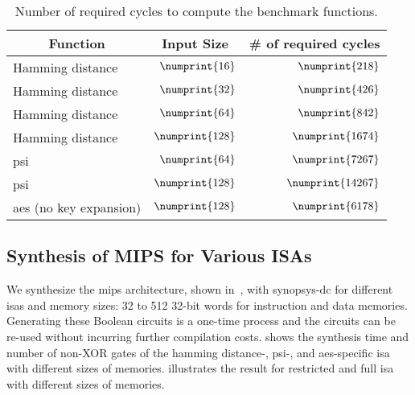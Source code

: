 \begin{table}
\centering
\caption{Number of required cycles to compute the benchmark functions.}\label{tab:cyc_bench}
\begin{tabular}{l||r|r}
\multicolumn{1}{c||}{Function} & \multicolumn{1}{c|}{Input Size} &  \multicolumn{1}{c}{\# of required cycles} \\
\hline
\hline
Hamming distance & $\numprint{16}$ & $\numprint{218}$\\
\hline
 Hamming distance & $\numprint{32}$ & $\numprint{426}$\\
\hline
Hamming distance & $\numprint{64}$ & $\numprint{842}$\\
\hline
Hamming distance & $\numprint{128}$ & $\numprint{1674}$\\
\hline
\acrshort{psi} & $\numprint{64}$ &$\numprint{7267}$\\
\hline
\acrshort{psi} & $\numprint{128}$ &$\numprint{14267}$\\
\hline
\acrshort{aes} (no key expansion) & $\numprint{128}$ & $\numprint{6178}$\\
\end{tabular}
\end{table}

\subsection{Synthesis of MIPS for Various ISAs}\label{ssect:eval-mips-sfe-isa}
We synthesize the \gls{mips} architecture, shown in~, with \gls{synopsys-dc} for different \acrshort{isa}s and memory sizes: 32 to 512 32-bit words for instruction and data memories.
Generating these Boolean circuits is a one-time process and the circuits can be re-used without incurring further compilation costs.
 shows the synthesis time and number of non-XOR gates of the hamming distance-, \acrshort{psi}-, and \acrshort{aes}-specific \acrshort{isa} with different sizes of memories.
 illustrates the result for restricted and full \acrshort{isa} with different sizes of memories.

